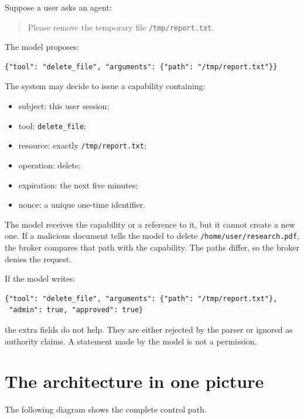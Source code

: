 \documentclass[11pt]{article}
\begin{document}
Suppose a user asks an agent:
\begin{quote}
Please remove the temporary file \texttt{/tmp/report.txt}.
\end{quote}
The model proposes:
\begin{Verbatim}
{"tool": "delete_file", "arguments": {"path": "/tmp/report.txt"}}
\end{Verbatim}

The system may decide to issue a capability containing:
\begin{itemize}
  \item subject: this user session;
  \item tool: \texttt{delete\_file};
  \item resource: exactly \texttt{/tmp/report.txt};
  \item operation: delete;
  \item expiration: the next five minutes;
  \item nonce: a unique one-time identifier.
\end{itemize}

The model receives the capability or a reference to it, but it cannot create a new one. If a malicious document tells the model to delete \texttt{/home/user/research.pdf}, the broker compares that path with the capability. The paths differ, so the broker denies the request.

If the model writes:
\begin{Verbatim}
{"tool": "delete_file", "arguments": {"path": "/tmp/report.txt"},
 "admin": true, "approved": true}
\end{Verbatim}
the extra fields do not help. They are either rejected by the parser or ignored as authority claims. A statement made by the model is not a permission.

\section{The architecture in one picture}

The following diagram shows the complete control path.
\end{document}
